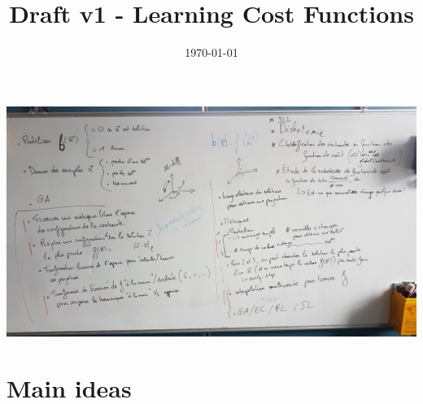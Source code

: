 \documentclass[a4paper, 12pt]{article}
\title{Draft v1 - Learning Cost Functions}
\date{\today}
\begin{document}
\maketitle

\includegraphics[width=\linewidth,angle=180]{20190529_whiteboard}

\section{Main ideas}
\end{document}
